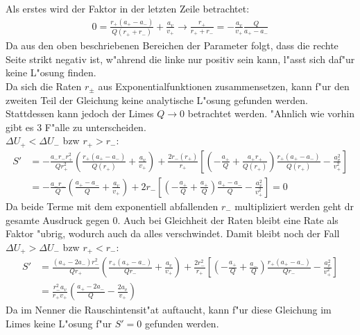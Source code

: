 \documentclass[12pt,a4paper]{article}
\begin{document}
Als erstes wird der Faktor in der letzten Zeile betrachtet:
\begin{eqnarray}
0=\frac{r_+(a_+-a_-)}{Q(r_++r_-)}+\frac{a_v}{v_+}\rightarrow\frac{r_+}{r_++r_-}=-\frac{a_v}{v_+}\frac{Q}{a_+-a_-}
\end{eqnarray}
Da aus den oben beschriebenen Bereichen der Parameter folgt, dass die rechte Seite strikt negativ ist, w"ahrend die linke nur positiv sein kann, l"asst sich daf"ur keine L"osung finden.\\
Da sich die Raten $r_\pm$ aus Exponentialfunktionen zusammensetzen, kann f"ur den zweiten Teil der Gleichung keine analytische L"osung gefunden werden. Stattdessen kann jedoch der Limes $Q\rightarrow0$ betrachtet werden. "Ahnlich wie vorhin gibt es 3 F"alle zu unterscheiden.\\
$\Delta U_+<\Delta U_-$ bzw $r_+>r_-$:
\begin{align*}\nonumber
S'&=-\frac{a_-r_-r_+^2}{Qr_+^2}\left(\frac{r_+(a_+-a_-)}{Q(r_+)}+\frac{a_v}{v_+}\right)+\frac{2r_-(r_+)}{r_+}\left[\left(-\frac{a_+}{Q}+\frac{a_+r_+}{Q(r_+)}\right)\frac{r_+(a_+-a_-)}{Q(r_+)}-\frac{a_v^2}{v_+^2}\right]\\
&=-\frac{a_-r_-}{Q}\left(\frac{a_+-a_-}{Q}+\frac{a_v}{v_+}\right)+2r_-\left[\left(-\frac{a_+}{Q}+\frac{a_+}{Q}\right)\frac{a_+-a_-}{Q}-\frac{a_v^2}{v_+^2}\right]=0
\end{align*}
Da beide Terme mit dem exponentiell abfallenden $r_-$ multipliziert werden geht dr gesamte Ausdruck gegen 0. Auch bei Gleichheit der Raten bleibt eine Rate als Faktor "ubrig, wodurch auch da alles verschwindet. Damit bleibt noch der Fall $\Delta U_+>\Delta U_-$ bzw $r_+<r_-$:
\begin{align*}
S'&=\frac{(a_+-2a_-)r_-^2}{Qr_+}\left(\frac{r_+(a_+-a_-)}{Qr_-}+\frac{a_v}{v_+}\right)+\frac{2r_-^2}{r_+}\left[\left(-\frac{a_+}{Q}+\frac{a_-}{Q}\right)\frac{r_+(a_+-a_-)}{Qr_-}-\frac{a_v^2}{v_+^2}\right]\\
&=\frac{r_-^2a_v}{r_+v_+}\left(\frac{a_+-2a_-}{Q}-\frac{2a_v}{v_+}\right)
\end{align*}
Da im Nenner die Rauschintensit"at auftaucht, kann f"ur diese Gleichung im Limes keine L"osung f"ur $S'=0$ gefunden werden.
\end{document}
